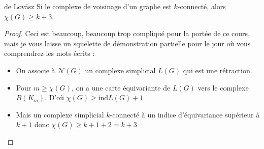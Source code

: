 \documentclass{cours}
\begin{document}
\begin{itemize}
\begin{théorème}{de Lovász}{}
Si le complexe de voisinage d'un graphe est $k$-connecté, alors $\chi(G) \geq k + 3$.
\end{théorème}
\begin{proof}
    Ceci est beaucoup, beaucoup trop compliqué pour la portée de ce cours, mais je vous laisse un squelette de démonstration partielle pour le jour où vous comprendrez les mots écrits\! :
    \begin{itemize}
        \item On associe à $\mathcal{N}(G)$ un complexe simplicial $L(G)$ qui est une rétraction.
        \item Pour $m \geq \chi(G)$, on a une carte équivariante de $L(G)$ vers le complexe $B(K_{m})$. D'où $\chi(G) \geq \text{ind}L(G) + 1$
        \item Mais un complexe simplicial $k$-connecté à un indice d'équivariance supérieur à $k + 1$ donc $\chi(G) \geq k + 1 + 2 = k + 3$
    \end{itemize}
\end{proof}
\end{itemize}
\end{document}
